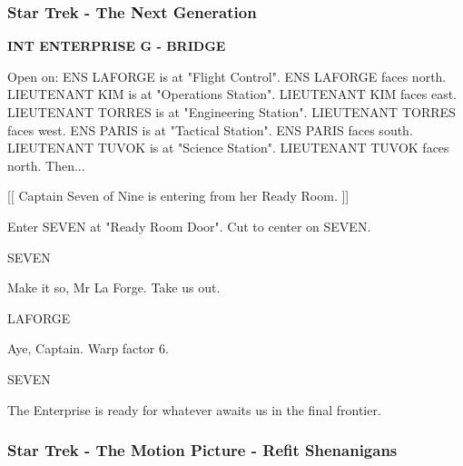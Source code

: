 \documentclass[11pt,letterpaper,oldstylefigures]{memoir}
\newcommand{\slugline}[1]{\nobreak\textbf{\MakeUppercase{#1}}\par\nobreak\vspace{1\baselineskip}}
\newcommand{\speaker}[1]{\nobreak\hspace*{0.333\textwidth}\MakeUppercase{#1}\par\nobreak\vspace{0.5\baselineskip}}
\newcommand{\dialogue}[1]{\nobreak\hspace*{0.25\textwidth}\begin{minipage}{0.5\textwidth}#1\end{minipage}\par\vspace{1\baselineskip}}
\newcommand{\stagedir}[1]{#1\par\vspace{1\baselineskip}}
\newenvironment{FountainExample}
  {\begingroup
  \ttfamily\small
   \setlength{\parindent}{0pt}
  \setlength{\parskip}{0.5em}
  \allowdisplaybreaks
  \setlength{\displaywidowpenalty}{0}
  \setlength{\widowpenalty}{0}
  \setlength{\clubpenalty}{0}
  \setlength{\interlinepenalty}{0}
}
  {\endgroup}
\newcommand{\paragraphbreak}{\vspace{0.5em}}
\begin{document}
\paragraphbreak

\subsubsection*{Star Trek - The Next Generation}
\label{ex:star-trek-the-next-generation-1}

\begin{FountainExample}
\slugline{INT ENTERPRISE G - BRIDGE}

\stagedir{Open on: ENS LAFORGE is at "Flight Control". ENS LAFORGE faces north. LIEUTENANT KIM is at "Operations Station". LIEUTENANT KIM faces east. LIEUTENANT TORRES is at "Engineering Station". LIEUTENANT TORRES faces west. ENS PARIS is at "Tactical Station". ENS PARIS faces south. LIEUTENANT TUVOK is at "Science Station". LIEUTENANT TUVOK faces north. Then...}
\stagedir{[[ Captain Seven of Nine is entering from her Ready Room. ]]}
\stagedir{Enter SEVEN at "Ready Room Door". Cut to center on SEVEN.}

\speaker{SEVEN}
\dialogue{Make it so, Mr La Forge. Take us out.}

\speaker{LAFORGE}
\dialogue{Aye, Captain. Warp factor 6.}

\speaker{SEVEN}
\dialogue{The Enterprise is ready for whatever awaits us in the final frontier.}
\end{FountainExample}

\paragraphbreak

\subsubsection*{Star Trek - The Motion Picture - Refit Shenanigans}
\label{ex:star-trek-motion-picture-refit}
\end{document}
